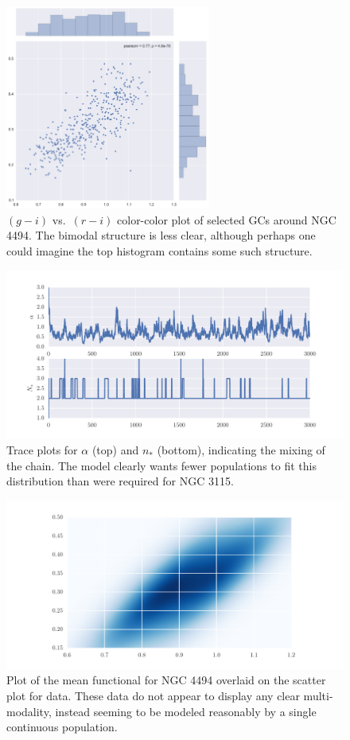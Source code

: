 \documentclass{article}
\begin{document}
\begin{figure}
\centering
\includegraphics[width=0.6\textwidth]{n4494_data.pdf}
\caption{$(g-i)$ vs.~$(r-i)$ color-color plot of selected GCs around NGC 4494. The bimodal structure is less clear, although
perhaps one could imagine the top histogram contains some such structure.}
\label{n4494_data}
\end{figure}

\begin{figure}
\centering
\includegraphics[width=\textwidth]{n4494_traces.pdf}
\caption{Trace plots for $\alpha$ (top) and $n_*$ (bottom), indicating the mixing of the chain. The model
clearly wants fewer populations to fit this distribution than were required for NGC 3115.}
\label{n4494_trace}
\end{figure}

\begin{figure}
\centering
\includegraphics[width=\textwidth]{n4494_data_fit}
\caption{Plot of the mean functional for NGC 4494 overlaid on the scatter plot for data. These data do not appear
to display any clear multi-modality, instead seeming to be modeled reasonably by a single continuous population.}
\label{n4494_functional}
\end{figure}
\end{document}
